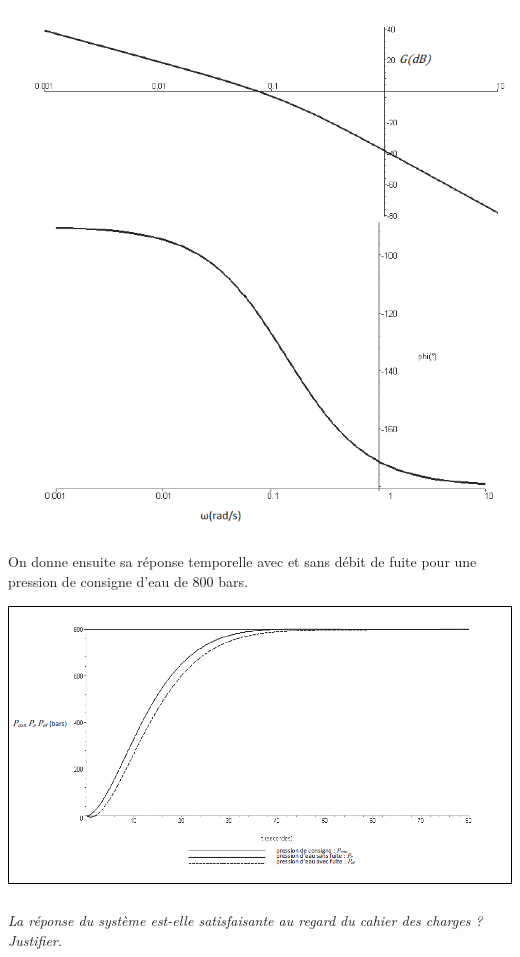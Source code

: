 \documentclass[10pt,fleqn]{article} %
\begin{document}
\begin{multicols}{2}
\begin{center}
\includegraphics[width=\linewidth]{images_02/fig_08}
\end{center}

On donne ensuite sa réponse temporelle avec et sans débit de fuite pour une pression de consigne d’eau de 800 bars.


\begin{center}
\includegraphics[width=\linewidth]{images_02/fig_09}
\end{center}

\subparagraph{}
\textit{La réponse du système est-elle satisfaisante au regard du cahier des charges ? Justifier.}


\end{multicols}
\end{document}
